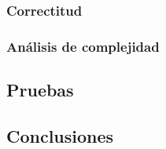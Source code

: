 \subsubsection{Correctitud} 



\subsubsection{An\'alisis de complejidad}
 
 

\subsection{Pruebas}



\subsection{Conclusiones}
